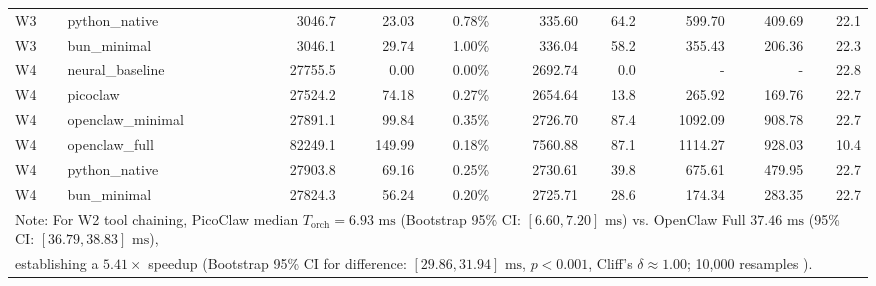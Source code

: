 \begin{table}[t]
\begin{tabular}{llrrrrrrrr}
W3 & python\_native & 3046.7 & 23.03 & 0.78\% & 335.60 & 64.2 & 599.70 & 409.69 & 22.1 \\
W3 & bun\_minimal & 3046.1 & 29.74 & 1.00\% & 336.04 & 58.2 & 355.43 & 206.36 & 22.3 \\
\midrule
W4 & neural\_baseline & 27755.5 & 0.00 & 0.00\% & 2692.74 & 0.0 & - & - & 22.8 \\
W4 & picoclaw & 27524.2 & 74.18 & 0.27\% & 2654.64 & 13.8 & 265.92 & 169.76 & 22.7 \\
W4 & openclaw\_minimal & 27891.1 & 99.84 & 0.35\% & 2726.70 & 87.4 & 1092.09 & 908.78 & 22.7 \\
W4 & openclaw\_full & 82249.1 & 149.99 & 0.18\% & 7560.88 & 87.1 & 1114.27 & 928.03 & 10.4 \\
W4 & python\_native & 27903.8 & 69.16 & 0.25\% & 2730.61 & 39.8 & 675.61 & 479.95 & 22.7 \\
W4 & bun\_minimal & 27824.3 & 56.24 & 0.20\% & 2725.71 & 28.6 & 174.34 & 283.35 & 22.7 \\
\midrule
\multicolumn{10}{l}{\footnotesize Note: For W2 tool chaining, PicoClaw median $T_{\text{orch}} = 6.93\text{ ms}$ (Bootstrap 95\% CI: $[6.60, 7.20]\text{ ms}$) vs. OpenClaw Full $37.46\text{ ms}$ (95\% CI: $[36.79, 38.83]\text{ ms}$),} \\
\multicolumn{10}{l}{\footnotesize establishing a $5.41\times$ speedup (Bootstrap 95\% CI for difference: $[29.86, 31.94]\text{ ms}$, $p < 0.001$, Cliff's $\delta \approx 1.00$; 10,000 resamples \cite{efron1979}).} \\
\bottomrule
\end{tabular}
\end{table}

